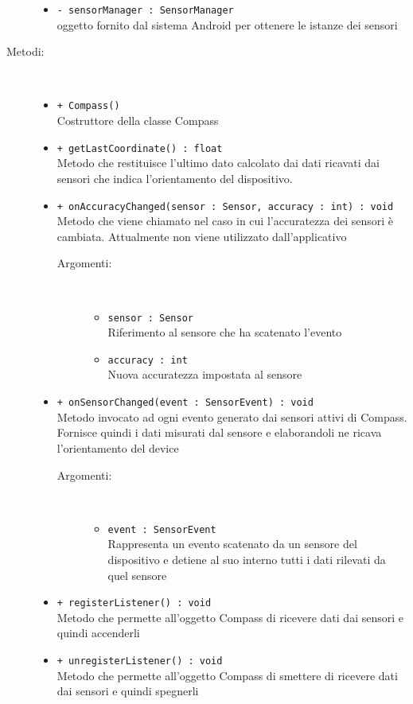 \documentclass[../DefinizioneDiProdotto.tex]{subfiles}
\begin{document}
\begin{description}
\begin{itemize}
\item \texttt{- sensorManager : SensorManager}\\
oggetto fornito dal sistema Android per ottenere le istanze dei sensori

\end{itemize}
\item[Metodi:] \
\begin{itemize}
\item \texttt{+ Compass()}\\
Costruttore della classe Compass
 \item \texttt{+ getLastCoordinate() : float}\\
Metodo che restituisce l'ultimo dato calcolato dai dati ricavati dai sensori che indica l'orientamento del dispositivo.
 \item \texttt{+ onAccuracyChanged(sensor : Sensor, accuracy : int) : void}\\
Metodo che viene chiamato nel caso in cui l'accuratezza dei sensori è cambiata. Attualmente non viene utilizzato dall'applicativo
 \begin{description}
\item[Argomenti:] \
\begin{itemize}
\item \texttt{sensor : Sensor}\\
Riferimento al sensore che ha scatenato l'evento\item \texttt{accuracy : int}\\
Nuova accuratezza impostata al sensore \end{itemize}
\end{description}
\item \texttt{+ onSensorChanged(event : SensorEvent) : void}\\
Metodo invocato ad ogni evento generato dai sensori attivi di Compass. Fornisce quindi i dati misurati dal sensore e elaborandoli ne ricava l'orientamento del device
 \begin{description}
\item[Argomenti:] \
\begin{itemize}
\item \texttt{event : SensorEvent}\\
Rappresenta un evento scatenato da un sensore del dispositivo e detiene al suo interno tutti i dati rilevati da quel sensore\end{itemize}
\end{description}
\item \texttt{+ registerListener() : void}\\
Metodo che permette all'oggetto Compass di ricevere dati dai sensori e quindi accenderli
 \item \texttt{+ unregisterListener() : void}\\
Metodo che permette all'oggetto Compass di smettere di ricevere dati dai sensori e quindi spegnerli
 \end{itemize}
\end{description}
\end{document}
